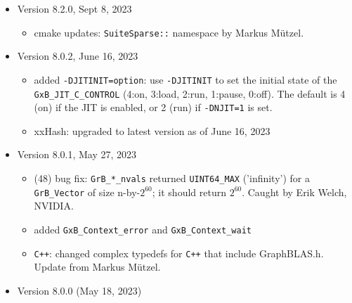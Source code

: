 \begin{itemize}
\item Version 8.2.0, Sept 8, 2023

    \begin{itemize}
    \item cmake updates: \verb'SuiteSparse::' namespace by Markus M\"{u}tzel.
    \end{itemize}

\item Version 8.0.2, June 16, 2023

    \begin{itemize}
    \item added \verb'-DJITINIT=option':  use \verb'-DJITINIT' to set the
        initial state of the \verb'GxB_JIT_C_CONTROL' (4:on, 3:load, 2:run,
        1:pause, 0:off).  The default is 4 (on) if the JIT is enabled, or 2
        (run) if \verb'-DNJIT=1' is set.
    \item xxHash: upgraded to latest version as of June 16, 2023
    \end{itemize}

\item Version 8.0.1, May 27, 2023

    \begin{itemize}
    \item (48) bug fix: \verb'GrB_*_nvals'
        returned \verb'UINT64_MAX' ('infinity') for a
        \verb'GrB_Vector' of size n-by-$2^{60}$; it should return $2^{60}$.
        Caught by Erik Welch, NVIDIA.
    \item added \verb'GxB_Context_error' and \verb'GxB_Context_wait'
    \item \verb'C++': changed complex typedefs for \verb'C++' that
        include GraphBLAS.h.  Update from Markus M\"{u}tzel.
    \end{itemize}

\item Version 8.0.0 (May 18, 2023)


\end{itemize}
